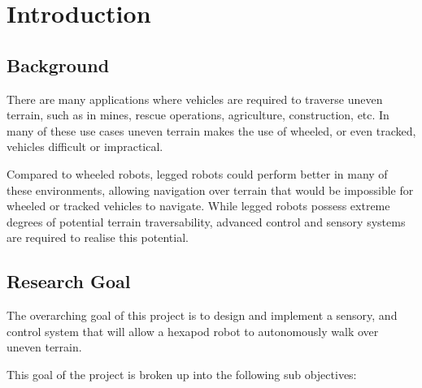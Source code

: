 \chapter{Introduction}

\section{Background}

    There are many applications where vehicles are required to traverse uneven terrain, such as in mines, rescue operations, agriculture, construction, etc. In many of these
    use cases uneven terrain makes the use of wheeled, or even tracked, vehicles difficult or impractical.

    Compared to wheeled robots, legged robots could perform better in many of these environments, allowing navigation over terrain that would be impossible for wheeled or
    tracked vehicles to navigate. While legged robots possess extreme degrees of potential terrain traversability, advanced control and sensory systems are required to 
    realise this potential.


\section{Research Goal}
    The overarching goal of this project is to design and implement a sensory, and control system that will allow a hexapod robot to autonomously walk over uneven terrain.

    This goal of the project is broken up into the following sub objectives:

